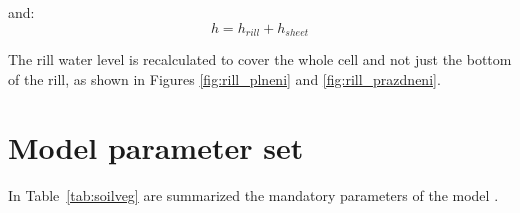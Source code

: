 and:
\begin{equation}
   h = h_{rill} + h_{sheet}  
\end{equation}

The rill water level is recalculated to cover the whole cell and not just the
bottom of the rill, as shown in Figures \ref{fig:rill_plneni} and
\ref{fig:rill_prazdneni}.


\section{Model parameter set}
In Table~\ref{tab:soilveg} are summarized the mandatory parameters of the model \smod.

%
%

%
